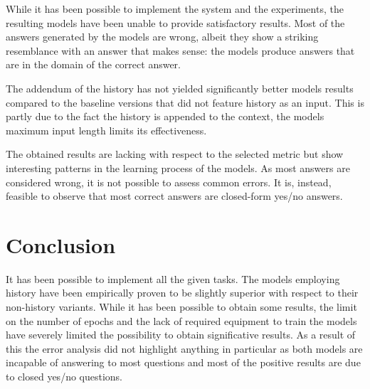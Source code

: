 \documentclass[11pt]{article}
\begin{document}

While it has been possible to implement the system and the experiments, the resulting models have been unable to provide satisfactory results. Most of the answers generated by the models are wrong, albeit they show a striking resemblance with an answer that makes sense: the models produce answers that are in the domain of the correct answer.

The addendum of the history has not yielded significantly better models results compared to the baseline versions that did not feature history as an input. This is partly due to the fact the history is appended to the context, the models maximum input length limits its effectiveness.

The obtained results are lacking with respect to the selected metric but show interesting patterns in the learning process of the models. As most answers are considered wrong, it is not possible to assess common errors. It is, instead, feasible to observe that most correct answers are closed-form yes/no answers.

\section{Conclusion}
\label{sec:conclusion}


It has been possible to implement all the given tasks. The models employing history have been empirically proven to be slightly superior with respect to their non-history variants. While it has been possible to obtain some results, the limit on the number of epochs and the lack of required equipment to train the models have severely limited the possibility to obtain significative results. As a result of this the error analysis did not highlight anything in particular as both models are incapable of answering to most questions and most of the positive results are due to closed yes/no questions.
\end{document}
